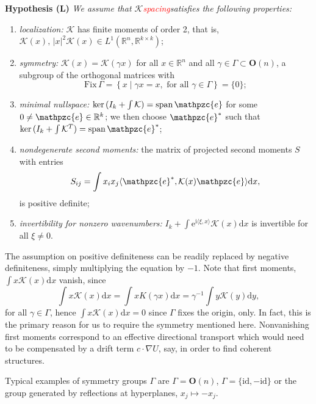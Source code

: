 \documentclass[10pt]{article}
\newenvironment{Hypothesis}[1]%
  {\begin{trivlist}\item[]{\bf Hypothesis #1 }\em}{\end{trivlist}}
\newcommand{\R}{\mathbb{R}}
\newcommand{\Ns}{\mathrm{ker\,}}
\newcommand{\rmd}{\mathrm{d}}
\newcommand{\rme}{\mathrm{e}}
\newcommand{\rmi}{\mathrm{i}}
\newcommand{\K}{\mathcal{K}}
\newcommand{\e}{\mathpzc{e}}
\begin{document}
\begin{Hypothesis}{(L)}We assume that  $\K$\textcolor{red}{spacing}satisfies the following properties:
\begin{enumerate}
\item \emph{localization:  }$\K$ has finite moments of order 2, that is, $\K(x),\, |x|^2\K(x) \in L^1(\R^n,\R^{k\times k})$;
\item \emph{symmetry: } $\K(x)=\K(\gamma x)$ for all $x\in\R^n$ and all $\gamma \in \Gamma\subset \mathbf{O}(n)$, a subgroup of the orthogonal matrices with 
\[
\mathrm{Fix}\, \Gamma=\left\{x\mid\gamma x=x, \mbox{ for all } \gamma\in\Gamma\right\}=\{0\};
\]

\item \emph{minimal nullspace: } $\Ns(I_k+\int\K)=\mathrm{span}\, {\e}$ for some  $ 0\neq {\e}\in \R^k$; we then choose ${\e}^*$ such that   $\Ns(I_k+\int\K^T)=\mathrm{span}\, {\e}^*$;
\item \emph{nondegenerate second moments:}  the matrix of projected second moments $S$ with entries 
\[
S_{ij}=\int x_ix_j \langle{\e}^*,\K(x) {\e}\rangle\rmd x,
\]
is positive definite;
\item \emph{invertibility for nonzero wavenumbers: } $I_k+ \int \rme^{\rmi \langle \xi,x\rangle}\K(x)\rmd x$ is invertible for all $\xi\neq 0$. 
\end{enumerate}
\end{Hypothesis}
The assumption on positive definiteness can be readily replaced by negative definiteness, simply multiplying the equation by $-1$. 
Note that first moments, $\int x\K(x)\rmd x$ vanish, since
\begin{equation}\label{e:1st}
\int x \K(x)\rmd x=\int x K(\gamma x)\rmd x= \gamma^{-1}\int y \K(y)\rmd y,
\end{equation}
for all $\gamma\in \Gamma$, hence $\int x \K(x)\rmd x=0$ since $\Gamma$ fixes the origin, only. In fact, this is the primary reason for us to require the symmetry mentioned here. Nonvanishing first moments correspond to an effective directional transport which would need to be compensated by a drift term $c\cdot \nabla U$, say, in order to find coherent structures. 

Typical examples of symmetry groups $\Gamma$ are $\Gamma=\mathbf{O}(n)$, $\Gamma=\{\mathrm{id},-\mathrm{id}\}$ or the group generated by reflections at hyperplanes, $x_j\mapsto -x_j$. 
\end{document}

